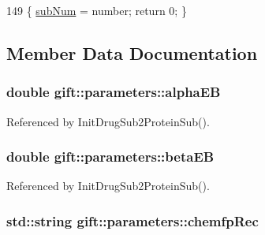 \begin{DoxyCode}
149 \{ \hyperlink{classgift_1_1parameters_a3736b9054e162bc4bf63d018744ff0c3}{subNum} = number; \textcolor{keywordflow}{return} 0; \}
\end{DoxyCode}


\subsection{Member Data Documentation}
\subsubsection[{\texorpdfstring{alpha\+EB}{alphaEB}}]{\setlength{\rightskip}{0pt plus 5cm}double gift\+::parameters\+::alpha\+EB}\hypertarget{classgift_1_1parameters_adbe3588acaf5006d064586809ffa3d28}{}\label{classgift_1_1parameters_adbe3588acaf5006d064586809ffa3d28}


Referenced by Init\+Drug\+Sub2\+Protein\+Sub().

\subsubsection[{\texorpdfstring{beta\+EB}{betaEB}}]{\setlength{\rightskip}{0pt plus 5cm}double gift\+::parameters\+::beta\+EB}\hypertarget{classgift_1_1parameters_a5c4260c7b30043ee69799d31d3a2a78e}{}\label{classgift_1_1parameters_a5c4260c7b30043ee69799d31d3a2a78e}


Referenced by Init\+Drug\+Sub2\+Protein\+Sub().

\subsubsection[{\texorpdfstring{chemfp\+Rec}{chemfpRec}}]{\setlength{\rightskip}{0pt plus 5cm}std\+::string gift\+::parameters\+::chemfp\+Rec}\hypertarget{classgift_1_1parameters_a87d9659a5c46d7075e8a795b51b7ce82}{}\label{classgift_1_1parameters_a87d9659a5c46d7075e8a795b51b7ce82}
